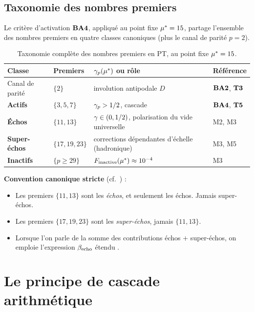 \subsection{Taxonomie des nombres premiers}
\label{sec:bridge:taxonomie}

Le critère d'activation $\textbf{BA4}$, appliqué au point fixe $\mu^{*} = 15$, partage l'ensemble des nombres premiers en quatre classes canoniques (plus le canal de parité $p = 2$).

\begin{table}[htbp]
\centering
\small
\begin{tabular}{@{}llll@{}}
\toprule
Classe & Premiers & $\gamma_{p}(\mu^{*})$ ou rôle & Référence \\
\midrule
Canal de parité & $\{2\}$ & involution antipodale $D$ & $\textbf{BA2}$, $\textbf{T3}$ \\
\textbf{Actifs} & $\{3, 5, 7\}$ & $\gamma_{p} > 1/2$, cascade & $\textbf{BA4}$, $\textbf{T5}$ \\
\textbf{Échos} & $\{11, 13\}$ & $\gamma_{} \in (0, 1/2)$, polarisation du vide universelle & M2, M3 \\
\textbf{Super-échos} & $\{17, 19, 23\}$ & corrections dépendantes d'échelle (hadronique) & M3, M5 \\
\textbf{Inactifs} & $\{p \geq 29\}$ & $F_{\rm inactive}(\mu^{*}) \approx 10^{-4}$ & M3 \\
\bottomrule
\end{tabular}
\caption{Taxonomie complète des nombres premiers en PT, au point fixe $\mu^{*} = 15$.}
\label{tab:taxonomie}
\end{table}

\textbf{Convention canonique stricte} (cf.~\cite{companion_M2,companion_M3}) :
\begin{itemize}[nosep,leftmargin=*]
\item Les premiers $\{11, 13\}$ sont les \emph{échos}, et seulement les échos. Jamais super-échos.
\item Les premiers $\{17, 19, 23\}$ sont les \emph{super-échos}, jamais $\{11, 13\}$.
\item Lorsque l'on parle de la somme des contributions échos $+$ super-échos, on emploie l'expression \og $\beta_{\rm echo}$ étendu \fg.
\end{itemize}

\section{Le principe de cascade arithmétique}
\label{sec:cascade}

